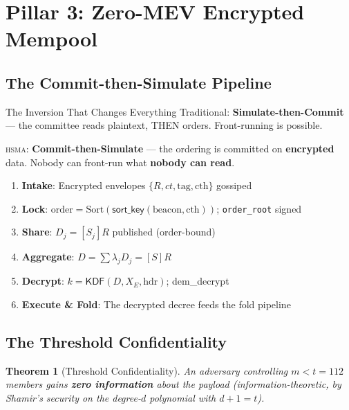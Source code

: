 \documentclass[11pt, a4paper]{article}
\newtheorem{theorem}{Theorem}
\newcommand{\hsma}{\textsc{hsma}}
\begin{document}
\section{Pillar 3: Zero-MEV Encrypted Mempool}
\label{sec:mev}

\subsection{The Commit-then-Simulate Pipeline}

\begin{warnbox}{The Inversion That Changes Everything}
Traditional: \textbf{Simulate-then-Commit} — the committee reads
plaintext, THEN orders. Front-running is possible.

\hsma{}: \textbf{Commit-then-Simulate} — the ordering is committed on
\textcolor{hsmaRed}{\textbf{encrypted}} data. Nobody can front-run
what \textcolor{hsmaRed}{\textbf{nobody can read}}.
\end{warnbox}

\begin{enumerate}
\item \textbf{Intake}: Encrypted envelopes $\{R, ct, \text{tag}, \text{cth}\}$ gossiped
\item \textbf{Lock}: $\text{order} = \text{Sort}(\textsf{sort\_key}(\text{beacon}, \text{cth}))$; \texttt{order\_root} signed
\item \textbf{Share}: $D_j = [S_j]R$ published (order-bound)
\item \textbf{Aggregate}: $D = \sum \lambda_j D_j = [S]R$ \item \textbf{Decrypt}: $k = \mathsf{KDF}(D, X_E, \text{hdr})$; dem\_decrypt
\item \textbf{Execute \& Fold}: The decrypted decree feeds the fold pipeline
\end{enumerate}

\subsection{The Threshold Confidentiality}

\begin{theorem}[Threshold Confidentiality]
\label{thm:threshold}
An adversary controlling $m < t = 112$ members gains \textbf{zero
information} about the payload (information-theoretic, by Shamir's
security on the degree-$d$ polynomial with $d+1 = t$).
\end{theorem}
\end{document}
